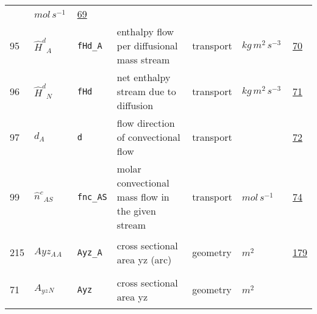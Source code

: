 \begin{longtable}{|p{1cm}|p{2.5cm}|p{4.5cm}|p{8cm}|p{3.0cm}|p{3cm}|p{1cm}|}
             & $ mol \,s^{-1} \, $
             &                 \hyperlink{"e:69"}{ 69 }
                 \\
            95
             & \hypertarget{"v:95"}{ $ {{\hat{H}^d}}{_{A}} $}
             & \verb|fHd_A|
             & enthalpy flow per diffusional mass stream
             & \begin{lay}transport \end{lay}
             & $ kg \,m^{2} \,s^{-3} \, $
             &                 \hyperlink{"e:70"}{ 70 }
                 \\
            96
             & \hypertarget{"v:96"}{ $ {{\hat{H}^d}}{_{N}} $}
             & \verb|fHd|
             & net enthalpy stream due to diffusion
             & \begin{lay}transport \end{lay}
             & $ kg \,m^{2} \,s^{-3} \, $
             &                 \hyperlink{"e:71"}{ 71 }
                 \\
            97
             & \hypertarget{"v:97"}{ $ {d}{_{A}} $}
             & \verb|d|
             & flow direction of convectional flow
             & \begin{lay}transport \end{lay}
             & $  $
             &                 \hyperlink{"e:72"}{ 72 }
                 \\
            99
             & \hypertarget{"v:99"}{ $ {{\hat{n}^c}}{_{{A S}}} $}
             & \verb|fnc_AS|
             & molar convectional mass flow in the given stream
             & \begin{lay}transport \end{lay}
             & $ mol \,s^{-1} \, $
             &                 \hyperlink{"e:74"}{ 74 }
                 \\
            215
             & \hypertarget{"v:215"}{ $ {Ayz_A}{_{A}} $}
             & \verb|Ayz_A|
             & cross sectional area yz (arc)
             & \begin{lay}geometry \end{lay}
             & $ m^{2} \, $
             &                 \hyperlink{"e:179"}{ 179 }
                 \\
            71
             & \hypertarget{"v:71"}{ $ {{A_{yz}}}{_{N}} $}
             & \verb|Ayz|
             & cross sectional area yz
             & \begin{lay}geometry \end{lay}
             & $ m^{2} \, $

\end{longtable}

